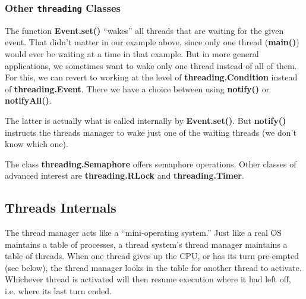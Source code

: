 % 
% 

\subsubsection{Other {\tt threading} Classes}

The function {\bf Event.set()} ``wakes'' all threads that are waiting
for the given event.  That didn't matter in our example above, since
only one thread ({\bf main()}) would ever be waiting at a time in that
example.  But in more general applications, we sometimes want to wake
only one thread instead of all of them.  For this, we can revert to
working at the level of {\bf threading.Condition} instead of {\bf
threading.Event}.  There we have a choice between using {\bf notify()}
or {\bf notifyAll()}.  

The latter is actually what is called internally by {\bf Event.set()}.
But {\bf notify()} instructs the threads manager to wake just one of
the waiting threads (we don't know which one).

The class {\bf threading.Semaphore} offers semaphore operations.  Other
classes of advanced interest are {\bf threading.RLock} and {\bf
threading.Timer}.

\subsection{Threads Internals}
\label{internals}

The thread manager acts like a ``mini-operating system.'' Just like a
real OS maintains a table of processes, a thread system's thread manager
maintains a table of threads.  When one thread gives up the CPU, or has
its turn pre-empted (see below), the thread manager looks in the table
for another thread to activate.  Whichever thread is activated will then
resume execution where it had left off, i.e. where its last turn ended. 

